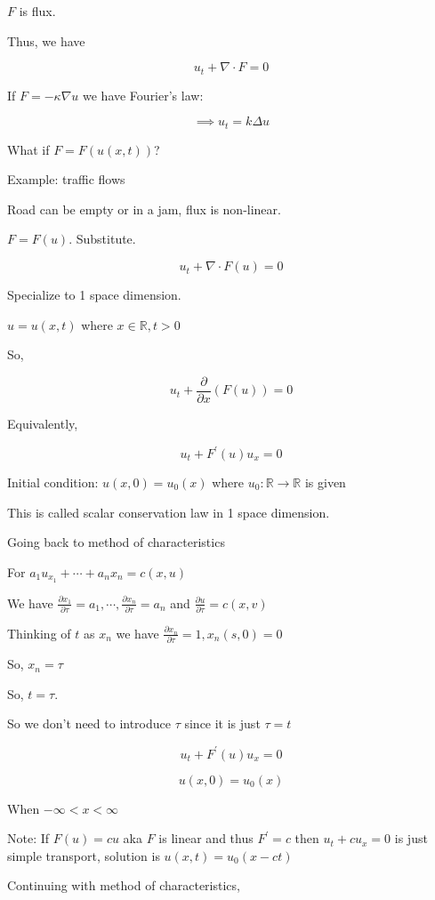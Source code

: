 \documentclass{article}
\theoremstyle{definition}
\begin{document}
\(F\) is flux.

Thus, we have

\[
    \boxed{u_t + \nabla\cdot F = 0}
\]

If \(F = - \kappa \nabla u\) we have Fourier's law:

\[
    \implies u_t = k \Delta u
\]

What if \(F = F(u(x,t))\)?

Example: traffic flows

Road can be empty or in a jam, flux is non-linear.

\(F = F(u)\). Substitute.

\[
    u_t + \nabla\cdot F(u) = 0
\]

Specialize to 1 space dimension.

\(u = u(x,t)\) where \(x\in\mathbb{R} ,t>0\) 

So,

\[
    u_t + \frac{\partial}{\partial x} (F(u)) = 0
\]

Equivalently,

\[
    u_t + F^{\prime} (u)u_x = 0
\]

Initial condition: \(u(x,0)=u_0(x)\) where \(u_0:\mathbb{R} \to \mathbb{R}\) is given

This is called scalar conservation law in 1 space dimension.

Going back to method of characteristics

For \(a_1 u_{x_1} + \cdots + a_n x_n = c(x,u)\) 

We have \(\frac{\partial x_1}{\partial \tau}=a_1,\cdots,\frac{\partial x_n}{\partial \tau} = a_n\) and \(\frac{\partial u}{\partial \tau} = c(x,v)\)

Thinking of \(t\) as \(x_n\) we have \(\frac{\partial x_n}{\partial \tau} = 1,x_n(s,0)=0\)

So, \(x_n = \tau\)

So, \(t = \tau\).

So we don't need to introduce \(\tau\) since it is just \(\tau = t\) 

\[
    u_t + F^{\prime} (u) u_x = 0
\]

\[
    u(x,0) = u_0(x)
\]

When \(-\infty < x < \infty\)

Note: If \(F(u)=cu\) aka \(F\) is linear and thus \(F^{\prime} = c\) then \(u_t + cu_x = 0\) is just simple transport, solution is \(u(x,t)=u_0(x-ct)\) 

Continuing with method of characteristics,
\end{document}
